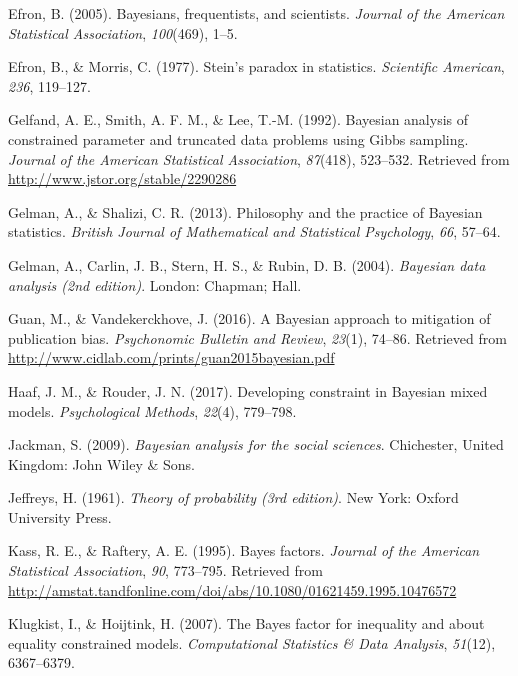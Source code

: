 \documentclass[english,man]{apa6}
\theoremstyle{definition}
\theoremstyle{definition}
\theoremstyle{remark}
\begin{document}
\hypertarget{ref-Efron:2005}{}
Efron, B. (2005). Bayesians, frequentists, and scientists. \emph{Journal
of the American Statistical Association}, \emph{100}(469), 1--5.

\hypertarget{ref-Efron:Morris:1977}{}
Efron, B., \& Morris, C. (1977). Stein's paradox in statistics.
\emph{Scientific American}, \emph{236}, 119--127.

\hypertarget{ref-Gelfand:etal:1992}{}
Gelfand, A. E., Smith, A. F. M., \& Lee, T.-M. (1992). Bayesian analysis
of constrained parameter and truncated data problems using Gibbs
sampling. \emph{Journal of the American Statistical Association},
\emph{87}(418), 523--532. Retrieved from
\url{http://www.jstor.org/stable/2290286}

\hypertarget{ref-Gelman:Shalizi:2013}{}
Gelman, A., \& Shalizi, C. R. (2013). Philosophy and the practice of
Bayesian statistics. \emph{British Journal of Mathematical and
Statistical Psychology}, \emph{66}, 57--64.

\hypertarget{ref-Gelman:etal:2004}{}
Gelman, A., Carlin, J. B., Stern, H. S., \& Rubin, D. B. (2004).
\emph{Bayesian data analysis (2nd edition)}. London: Chapman; Hall.

\hypertarget{ref-Guan:Vandekerckhove:2016}{}
Guan, M., \& Vandekerckhove, J. (2016). A Bayesian approach to
mitigation of publication bias. \emph{Psychonomic Bulletin and Review},
\emph{23}(1), 74--86. Retrieved from
\url{http://www.cidlab.com/prints/guan2015bayesian.pdf}

\hypertarget{ref-Haaf:Rouder:2017}{}
Haaf, J. M., \& Rouder, J. N. (2017). Developing constraint in Bayesian
mixed models. \emph{Psychological Methods}, \emph{22}(4), 779--798.

\hypertarget{ref-Jackman:2009}{}
Jackman, S. (2009). \emph{Bayesian analysis for the social sciences}.
Chichester, United Kingdom: John Wiley \& Sons.

\hypertarget{ref-Jeffreys:1961}{}
Jeffreys, H. (1961). \emph{Theory of probability (3rd edition)}. New
York: Oxford University Press.

\hypertarget{ref-Kass:Raftery:1995}{}
Kass, R. E., \& Raftery, A. E. (1995). Bayes factors. \emph{Journal of
the American Statistical Association}, \emph{90}, 773--795. Retrieved
from
\url{http://amstat.tandfonline.com/doi/abs/10.1080/01621459.1995.10476572}

\hypertarget{ref-Klugkist:Hoijtink:2007}{}
Klugkist, I., \& Hoijtink, H. (2007). The Bayes factor for inequality
and about equality constrained models. \emph{Computational Statistics \&
Data Analysis}, \emph{51}(12), 6367--6379.
\end{document}
